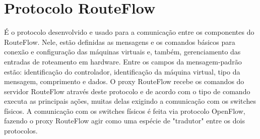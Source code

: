 \section{Protocolo RouteFlow}

É o protocolo desenvolvido e usado para a comunicação entre
os componentes do RouteFlow. Nele, estão definidas as
mensagens e os comandos básicos para conexão e configuração
das máquinas virtuais e, também, gerenciamento das entradas
de roteamento em hardware. Entre os campos da
mensagem-padrão estão: identificação do controlador,
identificação da máquina virtual, tipo da mensagem,
comprimento e dados. O proxy RouteFlow recebe os comandos do
servidor RouteFlow através deste protocolo e de acordo com o
tipo de comando executa as principais ações, muitas delas
exigindo a comunicação com os switches físicos. A
comunicação com os switches físicos é feita via protocolo
OpenFlow, fazendo o proxy RouteFlow agir como
uma espécie de "tradutor" entre os dois protocolos.